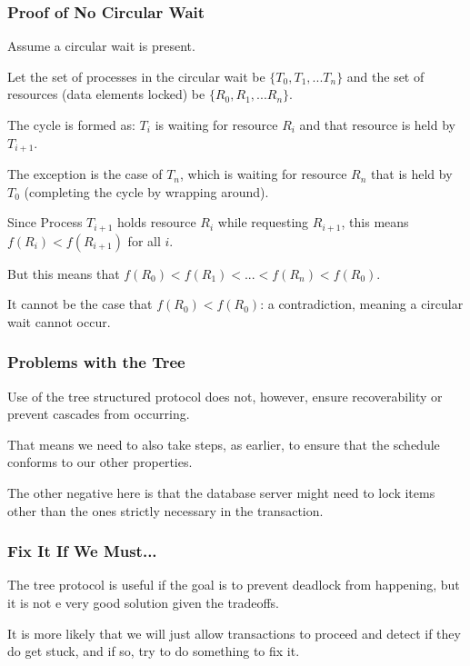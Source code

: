 \begin{frame}
\frametitle{Proof of No Circular Wait}

Assume a circular wait is present. 

Let the set of processes in the circular wait be $\{T_{0}, T_{1}, ... T_{n}\}$ and the set of resources (data elements locked) be $\{R_{0}, R_{1}, ... R_{n}\}$. 

The cycle is formed as: $T_{i}$ is waiting for resource $R_{i}$ and that resource is held by $T_{i+1}$. 

The exception is the case of $T_{n}$, which is waiting for resource $R_{n}$ that is held by $T_{0}$ (completing the cycle by wrapping around). 

Since Process $T_{i+1}$ holds resource $R_{i}$ while requesting $R_{i+1}$, this means $f(R_{i}) < f(R_{i+1})$ for all $i$. 

But this means that $f(R_{0}) < f(R_{1}) < ... < f(R_{n}) < f(R_{0})$. 

It cannot be the case that $f(R_{0}) < f(R_{0})$: a contradiction, meaning a circular wait cannot occur.


\end{frame}

\begin{frame}
\frametitle{Problems with the Tree}

Use of the tree structured protocol does not, however, ensure recoverability or prevent cascades from occurring. 

That means we need to also take steps, as earlier, to ensure that the schedule conforms to our other properties. 

The other negative here is that the database server might need to lock items other than the ones strictly necessary in the transaction.


\end{frame}

\begin{frame}
\frametitle{Fix It If We Must...}

The tree protocol is useful if the goal is to prevent deadlock from happening, but it is not e very good solution given the tradeoffs. 

It is more likely that we will just allow transactions to proceed and detect if they do get stuck, and if so, try to do something to fix it.



\end{frame}





